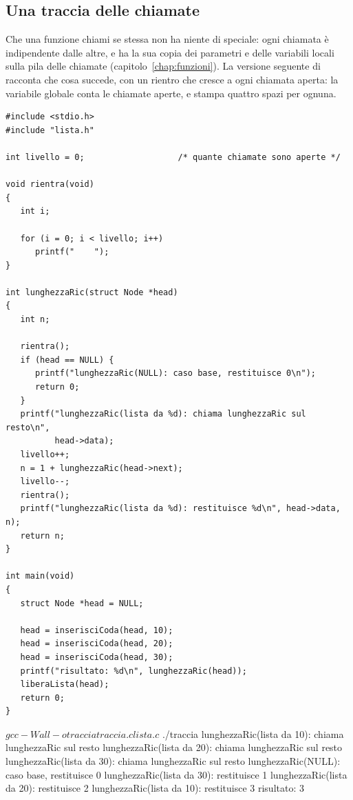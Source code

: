 \subsection{Una traccia delle chiamate}

Che una funzione chiami se stessa non ha niente di speciale: ogni chiamata è
indipendente dalle altre, e ha la sua copia dei parametri e delle variabili
locali sulla pila delle chiamate (capitolo~\ref{chap:funzioni}). La versione
seguente di  racconta che cosa succede, con un rientro
che cresce a ogni chiamata aperta: la variabile globale  conta
le chiamate aperte, e  stampa quattro spazi per ognuna.

\begin{lstlisting}[style=c, name=traccia.c]
#include <stdio.h>
#include "lista.h"

int livello = 0;                   /* quante chiamate sono aperte */

void rientra(void)
{
   int i;

   for (i = 0; i < livello; i++)
      printf("    ");
}

int lunghezzaRic(struct Node *head)
{
   int n;

   rientra();
   if (head == NULL) {
      printf("lunghezzaRic(NULL): caso base, restituisce 0\n");
      return 0;
   }
   printf("lunghezzaRic(lista da %d): chiama lunghezzaRic sul resto\n",
          head->data);
   livello++;
   n = 1 + lunghezzaRic(head->next);
   livello--;
   rientra();
   printf("lunghezzaRic(lista da %d): restituisce %d\n", head->data, n);
   return n;
}

int main(void)
{
   struct Node *head = NULL;

   head = inserisciCoda(head, 10);
   head = inserisciCoda(head, 20);
   head = inserisciCoda(head, 30);
   printf("risultato: %d\n", lunghezzaRic(head));
   liberaLista(head);
   return 0;
}
\end{lstlisting}

\begin{console}
$ gcc -Wall -o traccia traccia.c lista.c
$ ./traccia
lunghezzaRic(lista da 10): chiama lunghezzaRic sul resto
    lunghezzaRic(lista da 20): chiama lunghezzaRic sul resto
        lunghezzaRic(lista da 30): chiama lunghezzaRic sul resto
            lunghezzaRic(NULL): caso base, restituisce 0
        lunghezzaRic(lista da 30): restituisce 1
    lunghezzaRic(lista da 20): restituisce 2
lunghezzaRic(lista da 10): restituisce 3
risultato: 3
\end{console}

